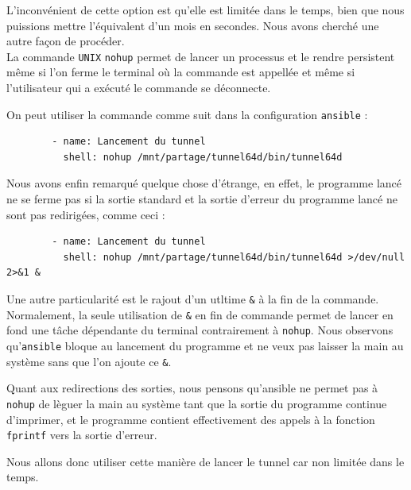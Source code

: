 \documentclass[a4paper, 10pt]{article}
\begin{document}
      L'inconvénient de cette option est qu'elle est limitée dans le temps, bien
      que nous puissions mettre l'équivalent d'un mois en secondes. Nous avons
      cherché une autre façon de procéder. \\

      La commande \verb+UNIX+ \verb+nohup+ permet de lancer un processus et le
      rendre persistent même si l'on ferme le terminal où la commande est
      appellée et même si l'utilisateur qui a exécuté le commande se déconnecte.

      On peut utiliser la commande comme suit dans la configuration
      \verb+ansible+ :

      \begin{verbatim}
        - name: Lancement du tunnel
          shell: nohup /mnt/partage/tunnel64d/bin/tunnel64d
      \end{verbatim}

      Nous avons enfin remarqué quelque chose d'étrange, en effet, le programme
      lancé ne se ferme pas si la sortie standard et la sortie d'erreur du
      programme lancé ne sont pas redirigées, comme ceci :

      \begin{verbatim}
        - name: Lancement du tunnel
          shell: nohup /mnt/partage/tunnel64d/bin/tunnel64d >/dev/null 2>&1 &
      \end{verbatim}

      Une autre particularité est le rajout d'un utltime \verb+&+ à la fin de la
      commande. Normalement, la seule utilisation de \verb+&+ en fin de commande
      permet de lancer en fond une tâche dépendante du terminal contrairement à
      \verb+nohup+. Nous observons qu'\verb+ansible+ bloque au lancement du
      programme et ne veux pas laisser la main au système sans que l'on ajoute
      ce \verb+&+.

      Quant aux redirections des sorties, nous pensons qu'ansible ne permet pas
      à \verb+nohup+ de lèguer la main au système tant que la sortie du
      programme continue d'imprimer, et le programme contient effectivement des
      appels à la fonction \verb+fprintf+ vers la sortie d'erreur.

      Nous allons donc utiliser cette manière de lancer le tunnel car non
      limitée dans le temps.
\end{document}
